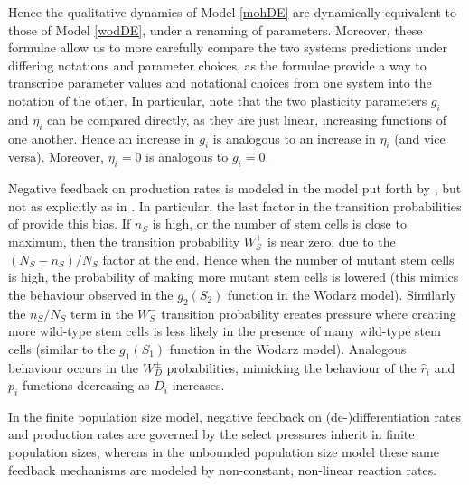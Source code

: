\documentclass[12pt]{article}
\begin{document}
Hence the qualitative dynamics of Model \ref{mohDE} are dynamically equivalent to those of Model \ref{wodDE}, under a renaming of parameters. Moreover, these formulae allow us to more carefully compare the two systems predictions under differing notations and parameter choices, as the formulae provide a way to transcribe parameter values and notational choices from one system into the notation of the other. In particular, note that the two plasticity parameters $g_i$ and $\eta_i$ can be compared directly, as they are just linear, increasing functions of one another. Hence an increase in $g_i$ is analogous to an increase in $\eta_i$ (and vice versa). Moreover, $\eta_i=0$ is analogous to $g_i=0$.

Negative feedback on production rates is modeled in the model put forth by \cite{mohammad}, but not as explicitly as in \cite{wodarz}. In particular, the last factor in the transition probabilities of \cite{mohammad} provide this bias. If $n_S$ is high, or the number of stem cells is close to maximum, then the transition probability $W_S^+$ is near zero, due to the $(N_S-n_S)/N_S$ factor at the end. Hence when the number of mutant stem cells is high, the probability of making more mutant stem cells is lowered (this mimics the behaviour observed in the $g_2(S_2)$ function in the Wodarz model). Similarly the $n_S/N_S$ term in the $W_S^-$ transition probability creates pressure where creating more wild-type stem cells is less likely in the presence of many wild-type stem cells (similar to the $g_1(S_1)$ function in the Wodarz model). Analogous behaviour occurs in the $W_D^{\pm}$ probabilities, mimicking the behaviour of the $\hat{r}_i$ and $p_i$ functions decreasing as $D_i$ increases. 

In the finite population size model, negative feedback on (de-)differentiation rates and production rates are governed by the select pressures inherit in finite population sizes, whereas in the unbounded population size model these same feedback mechanisms are modeled by non-constant, non-linear reaction rates. 
\end{document}
